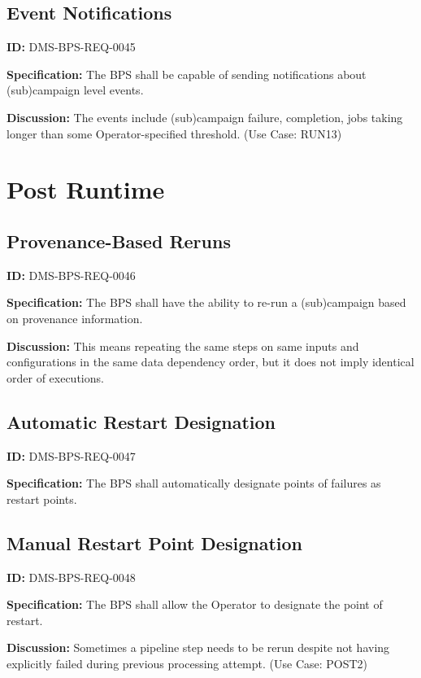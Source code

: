 \documentclass[SE,toc,lsstdraft]{lsstdoc}
\begin{document}
\subsection{Event Notifications}

\label{DMS-BPS-REQ-0045}
\textbf{ID:} DMS-BPS-REQ-0045

\textbf{Specification:}
The BPS shall be capable of sending notifications about (sub)campaign level events.

\textbf{Discussion:}
The events include (sub)campaign failure, completion, jobs taking longer than some Operator-specified threshold.  (Use Case: RUN13)

\section{Post Runtime}

\subsection{Provenance-Based Reruns}

\label{DMS-BPS-REQ-0046}
\textbf{ID:} DMS-BPS-REQ-0046

\textbf{Specification:}
The BPS shall have the ability to re-run a (sub)campaign based on provenance information.

\textbf{Discussion:}
This means repeating the same steps on same inputs and configurations in the same data dependency order, but it does not imply identical order of executions.

\subsection{Automatic Restart Designation}

\label{DMS-BPS-REQ-0047}
\textbf{ID:} DMS-BPS-REQ-0047

\textbf{Specification:}
The BPS shall automatically designate points of failures as restart points.

\subsection{Manual Restart Point Designation}

\label{DMS-BPS-REQ-0048}
\textbf{ID:} DMS-BPS-REQ-0048

\textbf{Specification:}
The BPS shall allow the Operator to designate the point of restart.

\textbf{Discussion:}
Sometimes a pipeline step needs to be rerun despite not having explicitly failed during previous processing attempt. (Use Case: POST2)
\end{document}

